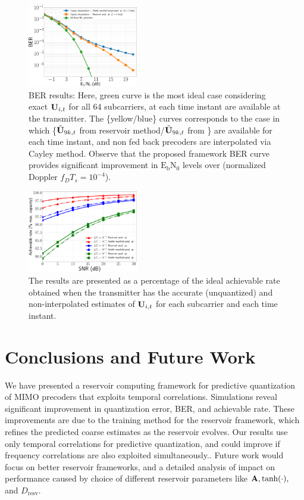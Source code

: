 \documentclass[conference]{IEEEtran}
\begin{document}
{\begin{figure}
\centering
\includegraphics[width=0.43\textwidth]{images/BER_res.pdf}
\caption{BER results: Here, green curve is the most ideal case considering exact ${\bf U}_{i,t}$ for all 64 subcarriers, at each time instant are available at the transmitter. The \{yellow/blue\} curves corresponds to the case in which \{$\tilde{{\bf U}}_{9k,t}$ from reservoir method/$\tilde{{\bf U}}_{9k,t}$ from \cite{6891198}\} are available for each time instant, and non fed back precoders are interpolated via Cayley method. Observe that the proposed framework BER curve provides significant improvement in $\text{E}_\text{b}\text{N}_0$ levels over \cite{6891198} (normalized Doppler $f_DT_s=10^{-4}$).}
\label{BER}
\end{figure}

\begin{figure}
\centering
\includegraphics[width=0.43\textwidth]{images/hopRate2.pdf}
\caption{The results are presented as a percentage of the ideal achievable rate obtained when the transmitter has the accurate (unquantized) and non-interpolated estimates of ${\bf U}_{i,t}$ for each subcarrier and each time instant.}
\label{achievrate}
\end{figure}

\section{Conclusions and Future Work}
\label{section5}

We have presented a reservoir computing framework for predictive quantization of MIMO precoders that exploits temporal correlations.
Simulations reveal significant improvement in quantization error, BER, and achievable rate.
These improvements are due to the training method for the reservoir framework, which refines the predicted coarse estimates as the reservoir evolves.
Our results use only temporal correlations for predictive quantization, and could improve if frequency correlations are also exploited simultaneously..
Future work would focus on better reservoir frameworks, and a detailed analysis of impact on performance caused by choice of different reservoir parameters like ${\bf A},\text{tanh}(\cdot),$ and $D_{\text{resv}}$.

}
\end{document}
